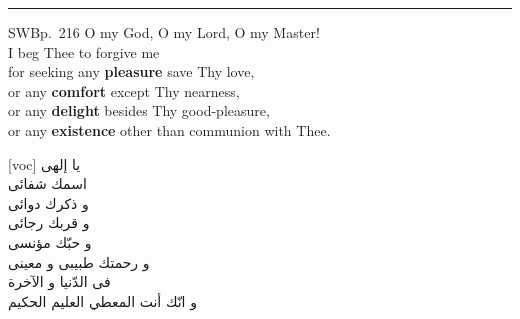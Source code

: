 \documentclass[14pt]{extarticle}
\begin{document}
\noindent\rule{2cm}{0.4pt}

\begin{hafez}{SWB}{p.~216}
  O my God, O my Lord, O my Master! \\
  I beg Thee to forgive me \\
  for seeking any \textbf{pleasure} save Thy love, \\
  or any \textbf{comfort} except Thy nearness, \\
  or any \textbf{delight} besides Thy good-pleasure, \\
  or any \textbf{existence} other than communion with Thee.
\end{hafez}

\newpage

\begin{hafez}{}{}
  \begin{farsi}[voc]
\LARGE
یا إلهی \\
اسمك شفائی \\
و ذکرك دوائی \\
و قربك رجائی \\
و حبّك مؤنسی \\
و رحمتك طبيبی و معينی \\
فی الدّنیا و الآخرة \\
و انّك أنت المعطي العليم الحکيم
  \end{farsi}
\end{hafez}

\newpage

\thispagestyle{empty}
\end{document}
